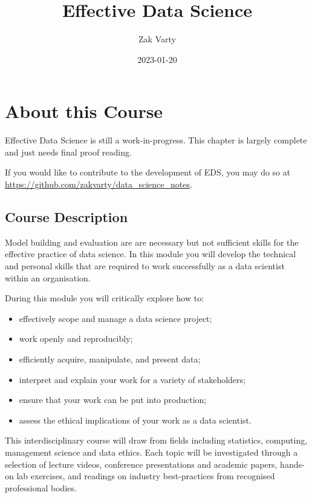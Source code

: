 \documentclass[
  12pt,
]{book}
\title{Effective Data Science}
\author{Zak Varty}
\date{2023-01-20}
\providecommand{\tightlist}{%
  \setlength{\itemsep}{0pt}\setlength{\parskip}{0pt}}
\begin{document}
\maketitle

{
\setcounter{tocdepth}{1}
\tableofcontents
}
\hypertarget{about-this-course}{%
\chapter*{About this Course}\label{about-this-course}}

Effective Data Science is still a work-in-progress. This chapter is largely complete and just needs final proof reading.

If you would like to contribute to the development of EDS, you may do so at \url{https://github.com/zakvarty/data_science_notes}.

\hypertarget{course-description}{%
\section*{Course Description}\label{course-description}}

Model building and evaluation are are necessary but not sufficient skills for the effective practice of data science. In this module you will develop the technical and personal skills that are required to work successfully as a data scientist within an organisation.

During this module you will critically explore how to:

\begin{itemize}
\tightlist
\item
  effectively scope and manage a data science project;
\item
  work openly and reproducibly;
\item
  efficiently acquire, manipulate, and present data;
\item
  interpret and explain your work for a variety of stakeholders;
\item
  ensure that your work can be put into production;
\item
  assess the ethical implications of your work as a data scientist.
\end{itemize}

This interdisciplinary course will draw from fields including statistics, computing, management science and data ethics. Each topic will be investigated through a selection of lecture videos, conference presentations and academic papers, hands-on lab exercises, and readings on industry best-practices from recognised professional bodies.
\end{document}
